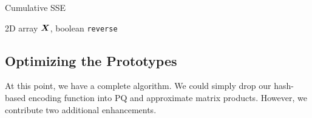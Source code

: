 \begin{algorithm}[h]
\caption{Cumulative SSE} \label{algo:cumSSE}
\begin{algorithmic}[1]
     2D array $\bm{X}$, boolean \texttt{reverse}
    \ENDIF


    \ENDFOR

        \ENDFOR
    \ENDFOR
\end{algorithmic}
\end{algorithm}

\subsection{Optimizing the Prototypes}

At this point, we have a complete algorithm. We could simply drop our hash-based encoding function into PQ and approximate matrix products. However, we contribute two additional enhancements.

